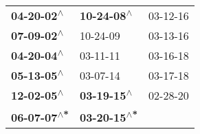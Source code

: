 \begin{supertabular}{lll}
  \textbf{04-20-02\textsuperscript{$\wedge$}} &   \textbf{10-24-08\textsuperscript{$\wedge$}} &  03-12-16\textsuperscript{} \\
  \textbf{07-09-02\textsuperscript{$\wedge$}} &                    10-24-09\textsuperscript{} &  03-13-16\textsuperscript{} \\
  \textbf{04-20-04\textsuperscript{$\wedge$}} &                    03-11-11\textsuperscript{} &  03-16-18\textsuperscript{} \\
  \textbf{05-13-05\textsuperscript{$\wedge$}} &                    03-07-14\textsuperscript{} &  03-17-18\textsuperscript{} \\
  \textbf{12-02-05\textsuperscript{$\wedge$}} &   \textbf{03-19-15\textsuperscript{$\wedge$}} &  02-28-20\textsuperscript{} \\
 \textbf{06-07-07\textsuperscript{$\wedge$*}} &  \textbf{03-20-15\textsuperscript{$\wedge$*}} &                             \\
\end{supertabular}
